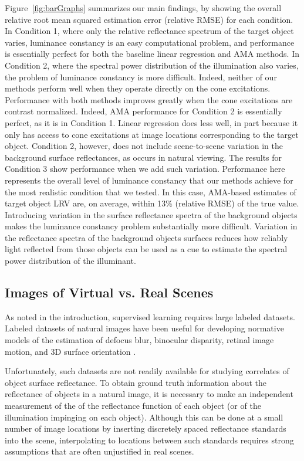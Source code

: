 \documentclass{jov}
\begin{document}
Figure~\ref{fig:barGraphs} summarizes our main findings, by showing the overall relative root mean squared estimation error (relative RMSE) for each condition. 
In Condition 1, where only the relative reflectance spectrum of the target object varies, 
luminance constancy is an easy computational problem,
and performance is essentially perfect for both the baseline linear regression and AMA methods.
In Condition 2, where the spectral power distribution of the illumination also varies, the problem of luminance constancy is more difficult.
Indeed, neither of our methods perform well when they operate directly on the cone excitations.
Performance with both methods improves greatly when the cone excitations are contrast normalized. 
Indeed, AMA performance for Condition 2 is essentially perfect, as it is in Condition 1.
Linear regression does less well, in part because it only has access to cone excitations at image locations
corresponding to the target object.
Condition 2, however, does not include scene-to-scene variation in the background surface reflectances,
as occurs in natural viewing.
The results for Condition 3 show performance when we add such variation.
Performance here represents the overall level of luminance constancy that our methods achieve for the
most realistic condition that we tested.
In this case, AMA-based estimates of target object LRV are, on average, within 13\% (relative RMSE) of the true value.
Introducing variation in the surface reflectance spectra of the background objects makes 
the luminance constancy problem substantially more difficult. 
Variation in the reflectance spectra of the background objects surfaces reduces how 
reliably light reflected from those objects can be used as a cue to estimate the spectral power distribution of the illuminant.

\subsection{Images of Virtual vs. Real Scenes}
As noted in the introduction, supervised learning requires large labeled datasets. Labeled datasets of natural images have been useful for developing normative models of the estimation of defocus blur, binocular disparity, retinal image motion, and 3D surface orientation \cite{burge2011optimal, burge2012optimal, burge2014optimal, burge2015optimal, sebastian2015defocus, kim2018lawful, burge2010natural, girshick2011cardinal, burge2016estimating, goncalves2017not}. 

Unfortunately, such datasets are not readily available for studying correlates of object surface reflectance.
To obtain ground truth information about the reflectance of objects in a natural image, it is necessary to make 
an independent measurement of the of the reflectance function of each object (or of the illumination impinging on each object).
Although this can be done at a small number of image locations by inserting discretely spaced reflectance standards into the scene, 
interpolating to locations between such standards requires strong assumptions that are often unjustified in real scenes.
\end{document}
